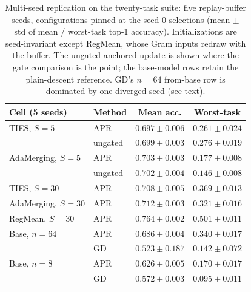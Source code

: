 \documentclass[11pt]{article}
\begin{document}
\begin{table}[t]
\centering
\small
\setlength{\tabcolsep}{5pt}
\caption{Multi-seed replication on the twenty-task suite: five replay-buffer seeds, configurations pinned at the seed-$0$ selections (mean $\pm$ std of mean / worst-task top-1 accuracy). Initializations are seed-invariant except RegMean, whose Gram inputs redraw with the buffer. The ungated anchored update is shown where the gate comparison is the point; the base-model rows retain the plain-descent reference. GD's $n{=}64$ from-base row is dominated by one diverged seed (see text).}
\label{tab:clip20seeds}
\begin{tabular}{llcc}
\toprule
Cell (5 seeds) & Method & Mean acc. & Worst-task \\
\midrule
TIES, $S{=}5$        & APR      & $0.697\pm0.006$ & $0.261\pm0.024$ \\
                     & ungated  & $0.699\pm0.003$ & $0.276\pm0.019$ \\
AdaMerging, $S{=}5$  & APR      & $0.703\pm0.003$ & $0.177\pm0.008$ \\
                     & ungated  & $0.702\pm0.004$ & $0.146\pm0.008$ \\
\midrule
TIES, $S{=}30$       & APR      & $0.708\pm0.005$ & $0.369\pm0.013$ \\
AdaMerging, $S{=}30$ & APR      & $0.712\pm0.003$ & $0.321\pm0.016$ \\
RegMean, $S{=}30$    & APR      & $0.764\pm0.002$ & $0.501\pm0.011$ \\
\midrule
Base, $n{=}64$       & APR      & $0.686\pm0.004$ & $0.340\pm0.017$ \\
                     & GD       & $0.523\pm0.187$ & $0.142\pm0.072$ \\
Base, $n{=}8$        & APR      & $0.626\pm0.005$ & $0.170\pm0.017$ \\
                     & GD       & $0.572\pm0.003$ & $0.095\pm0.011$ \\
\bottomrule
\end{tabular}
\end{table}
\end{document}
